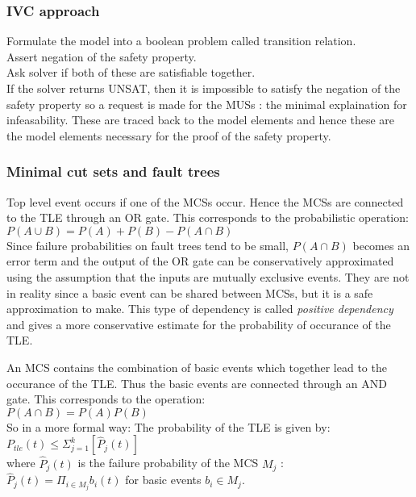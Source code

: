 \subsubsection{IVC approach}
Formulate the model into a boolean problem called transition relation. \\
Assert negation of the safety property.\\
Ask solver if both of these are satisfiable together.\\

If the solver returns UNSAT, then it is impossible to satisfy the negation of the safety property so a request is made for the MUSs : the minimal explaination for infeasability. These are traced back to the model elements and hence these are the model elements necessary for the proof of the safety property. 

\subsubsection{Minimal cut sets and fault trees}
Top level event occurs if one of the MCSs occur. Hence the MCSs are connected to the TLE through an OR gate. This corresponds to the probabilistic operation:\\

$P(A \cup B) = P(A) + P(B) - P(A \cap B)$\\

Since failure probabilities on fault trees tend to be small, $P(A \cap B)$ becomes an error term and the output of the OR gate can be conservatively approximated using the assumption that the inputs are mutually exclusive events. They are not in reality since a basic event can be shared between MCSs, but it is a safe approximation to make. This type of dependency is called  \textit{positive dependency} and gives a more conservative estimate for the probability of occurance of the TLE. 

An MCS contains the combination of basic events which together lead to the occurance of the TLE. Thus the basic events are connected through an AND gate. This corresponds to the operation: \\

$P(A \cap B) = P(A)P(B)$\\

So in a more formal way: 
The probability of the TLE is given by:\\

$P_{tle}(t) \leq \Sigma_{j=1}^k [\hat{P}_j(t)]$ \\

where $\hat{P}_j(t)$ is the failure probability of the MCS $M_j$ : \\

$\hat{P}_j(t) = \Pi_{i \in M_j} b_i(t)$ for basic events $b_i \in M_j$. 

